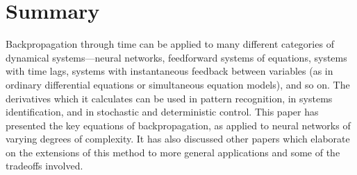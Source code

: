 \documentclass[journal]{IEEEtran} %
\begin{document}
\section{Summary}
Backpropagation through time can be applied to many different categories of dynamical systems---neural networks, feedforward systems of equations, systems with time lags, systems with instantaneous feedback between variables (as in ordinary differential equations or simultaneous equation models), and so on. The derivatives which it calculates can be used in pattern recognition, in systems identification, and in stochastic and deterministic control. This paper has presented the key equations of backpropagation, as applied to neural networks of varying degrees of complexity. It has also discussed other papers which elaborate on the extensions of this method to more general applications and some of the tradeoffs involved.
\end{document}
